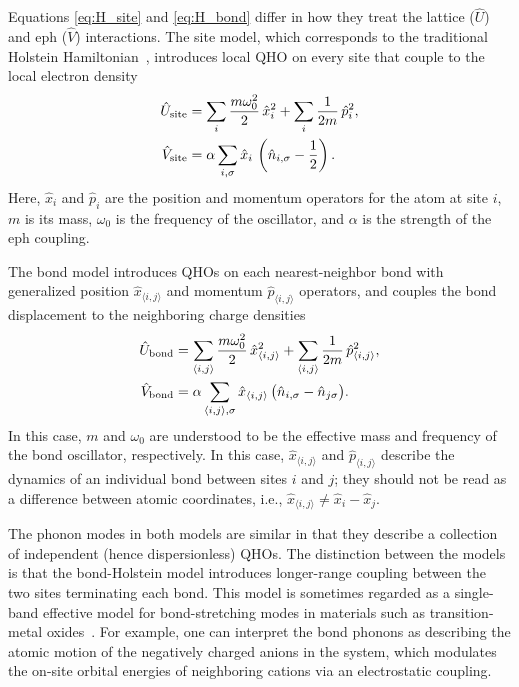 \documentclass[%
reprint,
superscriptaddress,
nofootinbib,
twocolumn,
amsmath,amssymb,
aps,
prb,
]{revtex4-2}
\begin{document}
Equations \eqref{eq:H_site} and \eqref{eq:H_bond} differ in how they treat the lattice ($\hat{U}$) and \gls*{eph} ($\hat{V}$) interactions. The site model, which corresponds to the traditional Holstein Hamiltonian~\cite{Holstein1959studiesI, Holstein1959studiesII}, introduces local \gls*{QHO} on every site that couple to the local electron density
\begin{equation}\label{eq:lattice_site}
\begin{split}
\hat{U}_{\rm site} &= \sum_i
\frac{m \omega_0^2}{2} \, \hat{x}_i^2
+\sum_i \frac{1}{2m} \, \hat{p}_i^2,\\
\hat{V}_{\rm site} &= \alpha \sum_{i,\sigma} \hat{x}_i \, \left( \hat{n}_{i,\sigma} -\frac{1}{2} \right).
\end{split}
\end{equation}
Here, $\hat{x}_i$ and $\hat{p}_i$ are the position and momentum operators for the atom at site $i$, $m$ is its mass, $\omega_0$ is the frequency of the oscillator, and $\alpha$ is the strength of the \gls*{eph} coupling. 

The bond model introduces \glspl*{QHO} on each nearest-neighbor bond with generalized position $\hat{x}_{\langle i,j\rangle}$ and momentum $\hat{p}_{\langle i,j\rangle}$ operators, and couples the bond displacement to the neighboring charge densities
\begin{equation}\label{eq:lattice_bond}
\begin{split}
\hat{U}_{\rm bond} &= \sum_{\langle i,j\rangle}
\frac{m \omega_0^2}{2} \, \hat{x}_{\langle i,j\rangle}^2
+ \sum_{\langle i,j\rangle}\frac{1}{2m} \, \hat{p}_{\langle i,j\rangle}^2, \\
\hat{V}_{\rm bond} &= \alpha \sum_{{\langle i,j\rangle},\sigma} \hat{x}_{\langle i,j\rangle} \, \big( \hat{n}_{i,\sigma} -\hat{n}_{j\sigma} \big).
\end{split}
\end{equation}
In this case, $m$ and $\omega_0$ are understood to be the effective mass and
frequency of the bond oscillator, respectively. In this case, $\hat{x}_{\langle i,j\rangle}$ and $\hat{p}_{\langle i,j\rangle}$ describe the dynamics of an individual bond between sites $i$ and $j$; they should not be read as a difference between atomic coordinates, i.e., $\hat{x}_{\langle i,j\rangle}\ne\hat{x}_i - \hat{x}_j$.

The phonon modes in both models are similar in that they describe a collection of independent (hence dispersionless) \glspl*{QHO}. The distinction between the models is that the bond-Holstein model introduces longer-range coupling between the two sites terminating each bond. This model is sometimes  regarded as a single-band effective model for bond-stretching modes in materials such as transition-metal oxides~\cite{Song1995electron, Slezak2006, Lau2007single}. For example, one can interpret the bond phonons as describing the atomic motion of the negatively charged anions in the system, which modulates the on-site orbital energies of neighboring cations via an electrostatic coupling.
\end{document}
